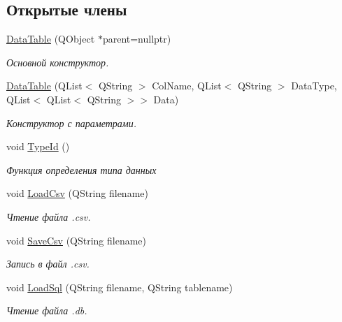 \subsection*{Открытые члены}
\begin{DoxyCompactItemize}
\item 
\mbox{\hyperlink{class_data_table_a639ccb380db236e70c17de76c05c67f2}{Data\+Table}} (Q\+Object $\ast$parent=nullptr)
\begin{DoxyCompactList}\small\item\em Основной конструктор. \end{DoxyCompactList}\item 
\mbox{\hyperlink{class_data_table_a91add7552f26453ea7d378a1ec24cd2a}{Data\+Table}} (Q\+List$<$ Q\+String $>$ Col\+Name, Q\+List$<$ Q\+String $>$ Data\+Type, Q\+List$<$ Q\+List$<$ Q\+String $>$$>$ Data)
\begin{DoxyCompactList}\small\item\em Конструктор с параметрами. \end{DoxyCompactList}\item 
\mbox{\label{class_data_table_a6f97f5c8d7fe892732d34945514c6c5d}} 
void \mbox{\hyperlink{class_data_table_a6f97f5c8d7fe892732d34945514c6c5d}{Type\+Id}} ()
\begin{DoxyCompactList}\small\item\em Функция определения типа данных \end{DoxyCompactList}\item 
void \mbox{\hyperlink{class_data_table_af46ecb3f9f33e2a34ec9866991cd12ff}{Load\+Csv}} (Q\+String filename)
\begin{DoxyCompactList}\small\item\em Чтение файла .csv. \end{DoxyCompactList}\item 
void \mbox{\hyperlink{class_data_table_afb7a2b7446f518aa5fe208dc6df1f686}{Save\+Csv}} (Q\+String filename)
\begin{DoxyCompactList}\small\item\em Запись в файл .csv. \end{DoxyCompactList}\item 
void \mbox{\hyperlink{class_data_table_ab9cbaf9a296c84eb4c969870d83a6555}{Load\+Sql}} (Q\+String filename, Q\+String tablename)
\begin{DoxyCompactList}\small\item\em Чтение файла .db. \end{DoxyCompactList}\item 
$$
\end{DoxyCompactItemize}
